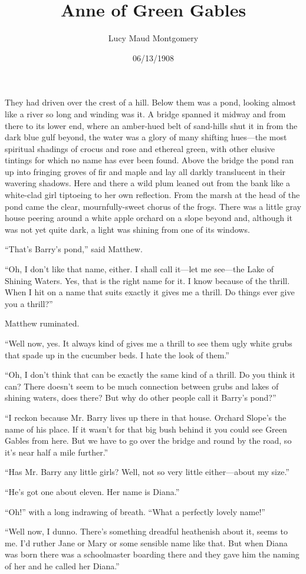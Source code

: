 \documentclass[a4paper]{article}
\title{Anne of Green Gables}
\author{Lucy Maud Montgomery}
\date{06/13/1908}
\begin{document}
\maketitle

\tiny{They had driven over the crest of a hill. Below them was a pond, looking almost like a river so long and winding was it. A bridge spanned it midway and from there to its lower end, where an amber-hued belt of sand-hills shut it in from the dark blue gulf beyond, the water was a glory of many shifting hues---the most spiritual shadings of crocus and rose and ethereal green, with other elusive tintings for which no name has ever been found. Above the bridge the pond ran up into fringing groves of fir and maple and lay all darkly translucent in their wavering shadows. Here and there a wild plum leaned out from the bank like a white-clad girl tiptoeing to her own reflection. From the marsh at the head of the pond came the clear, mournfully-sweet chorus of the frogs. There was a little gray house peering around a white apple orchard on a slope beyond and, although it was not yet quite dark, a light was shining from one of its windows.}

\scriptsize{``That's Barry's pond,'' said Matthew.

``Oh, I don't like that name, either. I shall call it---let me see---the Lake of Shining Waters. Yes, that is the right name for it. I know because of the thrill. When I hit on a name that suits exactly it gives me a thrill. Do things ever give you a thrill?''

Matthew ruminated.}

\footnotesize{``Well now, yes. It always kind of gives me a thrill to see them ugly white grubs that spade up in the cucumber beds. I hate the look of them.''

``Oh, I don't think that can be exactly the same kind of a thrill. Do you think it can? There doesn't seem to be much connection between grubs and lakes of shining waters, does there? But why do other people call it Barry's pond?''

``I reckon because Mr. Barry lives up there in that house. Orchard Slope's the name of his place. If it wasn't for that big bush behind it you could see Green Gables from here. But we have to go over the bridge and round by the road, so it's near half a mile further.''}

\small{``Has Mr. Barry any little girls? Well, not so very little either---about my size.''

``He's got one about eleven. Her name is Diana.''

``Oh!'' with a long indrawing of breath. ``What a perfectly lovely name!''

``Well now, I dunno. There's something dreadful heathenish about it, seems to me. I'd ruther Jane or Mary or some sensible name like that. But when Diana was born there was a schoolmaster boarding there and they gave him the naming of her and he called her Diana.''}
\end{document}
